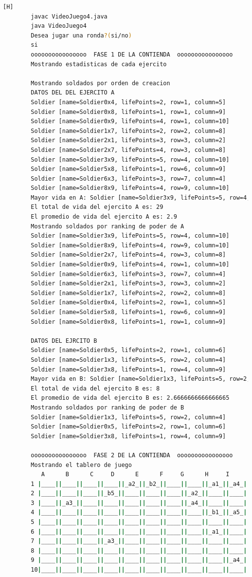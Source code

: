 \documentclass{article}
\begin{document}
	\begin{lstlisting}[language=bash,caption={Compilando y probando  }][H]
		javac VideoJuego4.java
		java VideoJuego4
		Desea jugar una ronda?(si/no)
		si
		oooooooooooooooo  FASE 1 DE LA CONTIENDA  oooooooooooooooo
		Mostrando estadisticas de cada ejercito
		
		Mostrando soldados por orden de creacion
		DATOS DEL DEL EJERCITO A
		Soldier [name=Soldier0x4, lifePoints=2, row=1, column=5]
		Soldier [name=Soldier0x8, lifePoints=1, row=1, column=9]
		Soldier [name=Soldier0x9, lifePoints=4, row=1, column=10]
		Soldier [name=Soldier1x7, lifePoints=2, row=2, column=8]
		Soldier [name=Soldier2x1, lifePoints=3, row=3, column=2]
		Soldier [name=Soldier2x7, lifePoints=4, row=3, column=8]
		Soldier [name=Soldier3x9, lifePoints=5, row=4, column=10]
		Soldier [name=Soldier5x8, lifePoints=1, row=6, column=9]
		Soldier [name=Soldier6x3, lifePoints=3, row=7, column=4]
		Soldier [name=Soldier8x9, lifePoints=4, row=9, column=10]
		Mayor vida en A: Soldier [name=Soldier3x9, lifePoints=5, row=4, column=10]
		El total de vida del ejercito A es: 29
		El promedio de vida del ejercito A es: 2.9
		Mostrando soldados por ranking de poder de A
		Soldier [name=Soldier3x9, lifePoints=5, row=4, column=10]
		Soldier [name=Soldier8x9, lifePoints=4, row=9, column=10]
		Soldier [name=Soldier2x7, lifePoints=4, row=3, column=8]
		Soldier [name=Soldier0x9, lifePoints=4, row=1, column=10]
		Soldier [name=Soldier6x3, lifePoints=3, row=7, column=4]
		Soldier [name=Soldier2x1, lifePoints=3, row=3, column=2]
		Soldier [name=Soldier1x7, lifePoints=2, row=2, column=8]
		Soldier [name=Soldier0x4, lifePoints=2, row=1, column=5]
		Soldier [name=Soldier5x8, lifePoints=1, row=6, column=9]
		Soldier [name=Soldier0x8, lifePoints=1, row=1, column=9]
		
		DATOS DEL EJRCITO B
		Soldier [name=Soldier0x5, lifePoints=2, row=1, column=6]
		Soldier [name=Soldier1x3, lifePoints=5, row=2, column=4]
		Soldier [name=Soldier3x8, lifePoints=1, row=4, column=9]
		Mayor vida en B: Soldier [name=Soldier1x3, lifePoints=5, row=2, column=4]
		El total de vida del ejercito B es: 8
		El promedio de vida del ejercito B es: 2.6666666666666665
		Mostrando soldados por ranking de poder de B
		Soldier [name=Soldier1x3, lifePoints=5, row=2, column=4]
		Soldier [name=Soldier0x5, lifePoints=2, row=1, column=6]
		Soldier [name=Soldier3x8, lifePoints=1, row=4, column=9]
		
		oooooooooooooooo  FASE 2 DE LA CONTIENDA  oooooooooooooooo
		Mostrando el tablero de juego
		   A      B      C     D      E      F     G      H     I      J
		1 |____||____||____||____||_a2_||_b2_||____||____||_a1_||_a4_|
		2 |____||____||____||_b5_||____||____||____||_a2_||____||____|
		3 |____||_a3_||____||____||____||____||____||_a4_||____||____|
		4 |____||____||____||____||____||____||____||____||_b1_||_a5_|
		5 |____||____||____||____||____||____||____||____||____||____|
		6 |____||____||____||____||____||____||____||____||_a1_||____|
		7 |____||____||____||_a3_||____||____||____||____||____||____|
		8 |____||____||____||____||____||____||____||____||____||____|
		9 |____||____||____||____||____||____||____||____||____||_a4_|
		10|____||____||____||____||____||____||____||____||____||____|
		

\end{lstlisting}
\end{document}
